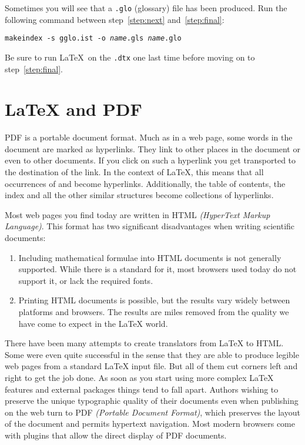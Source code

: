 Sometimes you will see that a \texttt{.glo}
(glossary) file has been produced. Run the following
command between
step~\ref{step:next} and~\ref{step:final}:

\noindent\texttt{makeindex -s gglo.ist -o \textit{name}.gls \textit{name}.glo}

\noindent Be sure to run \LaTeX\ on the \texttt{.dtx} one last
time before moving on to step~\ref{step:final}.



\section{\LaTeX{} and PDF}\label{sec:pdftex}
%
PDF is a portable  document format. Much as in a web page,
some words in the document are marked as hyperlinks. They link to other
places in the document or even to other documents. If you click
on such a hyperlink you get transported to the destination of the
link. In the context of \LaTeX{}, this means that all occurrences of
 and  become hyperlinks. Additionally, the table
of contents, the index and all the other similar structures become
collections of hyperlinks.

Most web pages you find today are written in HTML \emph{(HyperText
  Markup Language)}. This format has two significant disadvantages
when writing scientific documents:
\begin{enumerate}
\item Including mathematical formulae into HTML documents is not
  generally supported. While there is a standard for it, most browsers
  used today do not support it, or lack the required fonts.
\item Printing HTML documents is possible, but the results vary widely
  between platforms and browsers. The results are miles removed from
  the quality we have come to expect in the \LaTeX{} world.
\end{enumerate}

There have been many attempts to create translators from \LaTeX{} to
HTML. Some were even quite successful in the sense that they are able
to produce legible web pages from a standard \LaTeX{} input file. But
all of them cut corners left and right to get the job done. As soon as
you start using more complex \LaTeX{} features and external packages
things tend to fall apart. Authors wishing to preserve the unique
typographic quality of their documents even when publishing on the web
turn to PDF \emph{(Portable Document Format)}, which preserves the
layout of the document and permits hypertext
navigation. Most modern browsers come with plugins that allow the
direct display of PDF documents.

